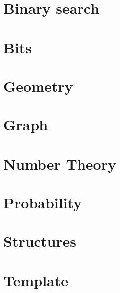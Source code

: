 \documentclass[twoside]{article}
\begin{document}
\selectfont
\begin{multicols*}{2}
	\tableofcontents
	\newpage
	\newpage
	\cleardoublepage
	\section{Binary search}
	    
	
	\section{Bits}
	    
	
	\section{Geometry}
	    
	
	\section{Graph}
	    

	\section{Number Theory}
	    
    
	\section{Probability}
	    
	
	\section{Structures}
	    
	\section{Template}
    	
    
\end{multicols*}
\end{document}
